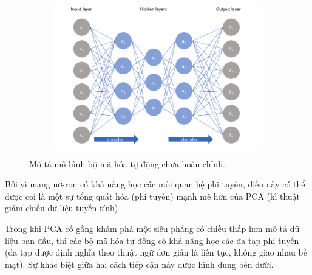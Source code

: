 \begin{figure}
    \begin{subfigure}{0.8\textwidth}
        \includegraphics[width=1.\linewidth]{Chapters/items/auto2.jpg}
        \caption{}
        \label{fig: auto2}
    \end{subfigure}
    \caption{Mô tả mô hình bộ mã hóa tự động chưa hoàn chỉnh.}
\end{figure}

Bởi vì mạng nơ-ron có khả năng học các mối quan hệ phi tuyến,
điều này có thể được coi là một sự tổng quát hóa (phi tuyến)
mạnh mẽ hơn của PCA (kĩ thuật giảm chiều dữ liệu tuyến tính)

\newpage
Trong khi PCA cố gắng khám phá một siêu phẳng có chiều thấp hơn
mô tả dữ liệu ban đầu, thì các bộ mã hóa tự động có khả năng học các
đa tạp phi tuyến (đa tạp được định nghĩa theo thuật ngữ đơn giản
là liên tục, không giao nhau bề mặt). Sự khác biệt giữa hai cách
tiếp cận này được hình dung bên dưới.


